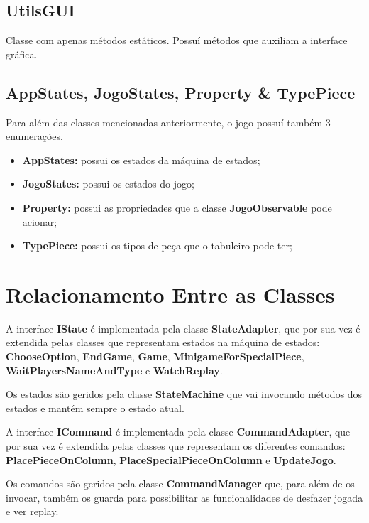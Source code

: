 \documentclass[11pt]{article}
\begin{document}
	
	\large
	\subsection{UtilsGUI}
	\normalsize
	
	Classe com apenas métodos estáticos. Possuí métodos que auxiliam a interface gráfica.
	
	
	\large
	\subsection{AppStates, JogoStates, Property \& TypePiece}
	\normalsize
	
	Para além das classes mencionadas anteriormente, o jogo possuí também 3 enumerações.
	
	\begin{itemize}
		\item \textbf{AppStates:} possui os estados da máquina de estados;
		\item \textbf{JogoStates:} possui os estados do jogo;
		\item \textbf{Property:} possui as propriedades que a classe \textbf{JogoObservable} pode acionar;
		\item \textbf{TypePiece:} possui os tipos de peça que o tabuleiro pode ter;
	\end{itemize}


	\large
	\section{Relacionamento Entre as Classes}
	\normalsize
	
	A interface \textbf{IState} é implementada pela classe \textbf{StateAdapter}, que por sua vez é extendida pelas classes que representam estados na máquina de estados: \textbf{ChooseOption}, \textbf{EndGame}, \textbf{Game}, \textbf{MinigameForSpecialPiece}, \textbf{WaitPlayersNameAndType} e \textbf{WatchReplay}.
	
	Os estados são geridos pela classe \textbf{StateMachine} que vai invocando métodos dos estados e mantém sempre o estado atual.
	
	A interface \textbf{ICommand} é implementada pela classe \textbf{CommandAdapter}, que por sua vez é extendida pelas classes que representam os diferentes comandos: \textbf{PlacePieceOnColumn}, \textbf{PlaceSpecialPieceOnColumn} e \textbf{UpdateJogo}.
	
	Os comandos são geridos pela classe \textbf{CommandManager} que, para além de os invocar, também os guarda para possibilitar as funcionalidades de desfazer jogada e ver replay.
	
\end{document}
